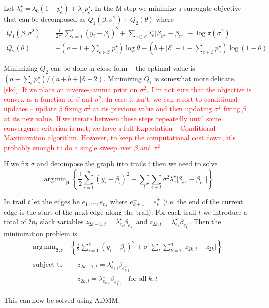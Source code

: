 \documentclass[12pt]{article}
\DeclareMathOperator*{\argmin}{arg\,min}
\def\bbeta{\boldsymbol{\beta}}
\begin{document}
Let $\lambda^{\star}_{e} = \lambda_{0}(1 - p^{\star}_{e}) + \lambda_{1}p^{\star}_{e}.$ 
In the M-step we minimize a surrogate objective that can be decomposed as $Q_{1}(\beta, \sigma^{2}) + Q_{2}(\theta)$ where
\begin{align*}
Q_{1}(\beta, \sigma^{2}) &= \frac{1}{2\sigma^{2}}\sum_{i = 1}^{n}{(y_{i} - \beta_{i})^{2}} + \sum_{e \in \mathcal{E}}{\lambda^{\star}_{e}\lvert \beta_{e^{+}} - \beta_{e^{-}}\rvert} - \log{\pi(\sigma^{2})} \\
Q_{2}(\theta) &= -\left(a - 1 + \sum_{e \in \mathcal{E}}{p^{\star}_{e}}\right)\log{\theta} - \left(b + \lvert \mathcal{E} \rvert - 1 - \sum_{e \in \mathcal{E}}{p^{\star}_{e}}\right)\log{(1 - \theta)}
\end{align*}

Minimizing  $Q_{2}$ can be done in close form -- the optimal value is $(a + \sum_{e}{p^{\star}_{e}})/(a + b + \lvert \mathcal{E} - 2).$
Minimizing $Q_{1}$ is somewhat more delicate.
\textcolor{red}{[skd]: If we place an inverse-gamma prior on $\sigma^{2},$ I'm not sure that the objective is convex as a function of $\beta$ and $\sigma^{2}$. In case it isn't, we can resort to conditional updates -- update $\beta$ fixing $\sigma^{2}$ at its previous value and then updating $\sigma^{2}$ fixing $\beta$ at its new value.
If we iterate between these steps repeatedly until some convergence criterion is met, we have a full Expectation -- Conditional Maximization algorithm.
However, to keep the computational cost down, it's probably enough to do a single sweep over $\beta$ and $\sigma^{2}$.}

If we fix $\sigma$ and decompose the graph into trails $t$ then we need to solve
$$
\argmin_{\bbeta}\left\{\frac{1}{2}\sum_{i = 1}^{n}{(y_{i} - \beta_{i})^{2}} + \sum_{t}{\sum_{e \in t}{\sigma^{2}\lambda^{\star}_{e}\lvert \beta_{e^{+}} - \beta_{e^{-}}\rvert}}\right\}
$$

In trail $t$ let the edges be $e_{1}, \ldots, e_{n_{t}}$ where $e^{-}_{k+1} = e^{+}_{k}$ (i.e. the end of the current edge is the start of the next edge along the trail). 
For each trail $t$ we introduce a total of $2n_{t}$ slack variables $z_{2k - 1,t} = \lambda^{\star}_{e_{k}}\beta_{e^{-}_{k}}$ and $z_{2k,t} = \lambda^{\star}_{e_{k}}\beta_{e_{k}^{+}}.$
Then the minimization problem is
\begin{align*}
\argmin_{\bbeta, z} &~ \left\{\frac{1}{2}\sum_{i = 1}^{n}{(y_{i} - \beta_{i})^{2}} + \sigma^{2}\sum_{t}\sum_{k = 1}^{n_{t}}{\lvert z_{2k,t} - z_{2k} \rvert}\right\} \\
~ & ~ \\
\text{subject to} &~ \quad z_{2k-1,t} = \lambda^{\star}_{e_{k,t}}\beta_{e_{k,t}^{+}} \\
~ & ~ \quad z_{2k,t} = \lambda^{\star}_{e_{k,t}}\beta_{e_{k,t}^{-}} \quad \text{for all $k,t$} 
\end{align*}

This can now be solved using ADMM.
\end{document}
